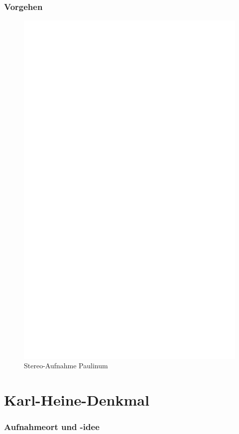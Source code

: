 \documentclass[liststotoc,bibtotoc,fontsize=14pt,]{scrreprt}
\begin{document}
	\subsubsection{Vorgehen}

	
	\newpage
	\begin{figure}[h]
		\includegraphics[width=\linewidth]{img/ph.jpg}
		\caption{Stereo-Aufnahme Paulinum}
	\end{figure}

\section{Karl-Heine-Denkmal}
\label{sec:palme}
\subsubsection{Aufnahmeort und -idee}
\end{document}

